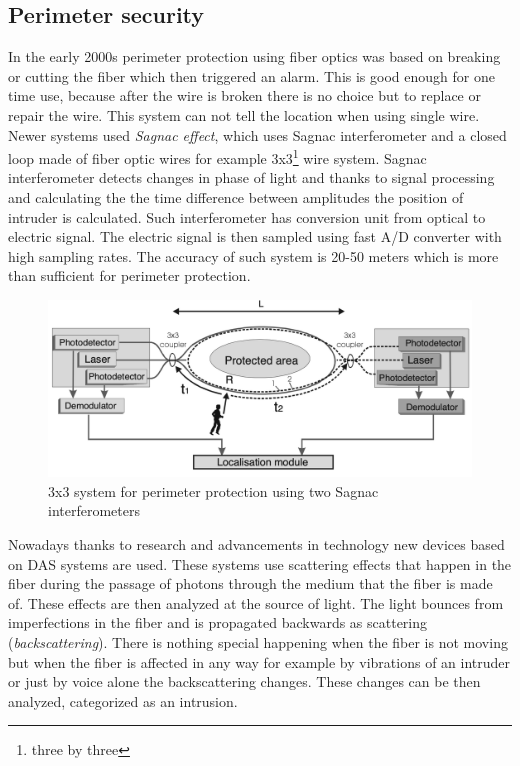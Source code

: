 \subsection{Perimeter security}

In the early 2000s perimeter protection using fiber optics was based on breaking or cutting the fiber which then triggered an alarm. This is good enough for one time use, because after the wire is broken there is no choice but to replace or repair the wire. This system can not tell the location when using single wire. Newer systems used \textit{Sagnac effect}, which uses Sagnac interferometer and a closed loop made of fiber optic wires for example 3x3\footnote{three by three} wire system. Sagnac interferometer detects changes in phase of light and thanks to signal processing and calculating the the time difference between amplitudes the position of intruder is calculated. Such interferometer has conversion unit from optical to electric signal. The electric signal is then sampled using fast A/D converter with high sampling rates. The accuracy of such system is 20-50 meters which is more than sufficient for perimeter protection\cite{perimeterpolsko}. 

\begin{figure}
    \centering
    \includegraphics[width=\linewidth]{obrazky/sagnac_interrogator.png}
    \caption{3x3 system for perimeter protection using two Sagnac interferometers\cite{perimeterpolsko}}
    \label{fig:sagnac}
\end{figure}

Nowadays thanks to research and advancements in technology new devices based on DAS systems are used. These systems use scattering effects that happen in the fiber during the passage of photons through the medium that the fiber is made of. These effects are then analyzed at the source of light. The light bounces from imperfections in the fiber and is propagated backwards as scattering (\textit{backscattering}). There is nothing special happening when the fiber is not moving but when the fiber is affected in any way for example by vibrations of an intruder or just by voice alone the backscattering changes. These changes can be then analyzed, categorized as an intrusion.


